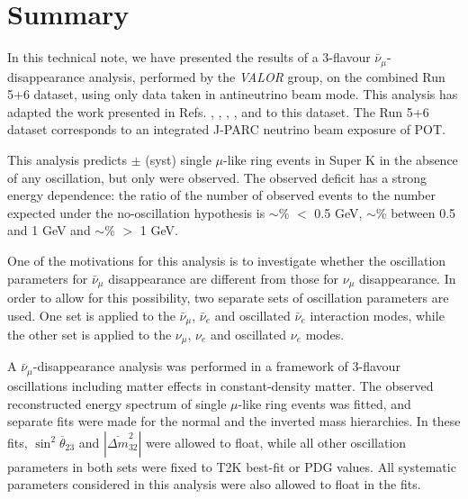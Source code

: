 \clearpage


\section {Summary}
\label{sec:summary}

In this technical note,
we have presented the results of a 3-flavour $\bar{\nu}_{\mu}$-disappearance analysis,
performed by the {\em VALOR} group,
on the combined Run 5+6 \TotalPot{} dataset, using only data taken in antineutrino beam mode.
This analysis has adapted the work presented in
Refs. \cite{OurRun1DisappAnalysis}, 
\cite{OurRun12DisappAnalysis}, 
\cite{OurRun12DisappAnalysis3Flavour},
\cite{OurRun123DisappAnalysis3Flavour},
\cite{OurRun1234aDisappAnalysis3Flavour} and 
\cite{OurRun1234DisappAnalysis3Flavour}
to this dataset. The Run 5+6 dataset corresponds to an integrated J-PARC neutrino beam
exposure of \TotalPot{} POT.

This analysis predicts \NskNoOscExpectation{} $\pm$ \NskNoOscExpectationError{} (syst)
single $\mu$-like ring events in Super K in the absence of any oscillation,
but only \NskObserved{} were observed. 
The observed deficit has a strong energy dependence: the ratio of the number of observed events to 
the number expected under the no-oscillation hypothesis is
$\sim$\NskRatioLowEnergy\% $<$ 0.5 GeV,
$\sim$\NskRatioMidEnergy\% between 0.5 and 1 GeV and
$\sim$\NskRatioHighEnergy\% $>$ 1 GeV.

One of the motivations for this analysis is to investigate whether the oscillation parameters for $\bar{\nu}_{\mu}$ 
disappearance are different from those for $\nu_{\mu}$ disappearance. In order to allow for this possibility, 
two separate sets of oscillation parameters are used. One set is applied to the $\bar{\nu}_{\mu}$, $\bar{\nu}_{e}$ 
and oscillated $\bar{\nu}_{e}$ interaction modes, while the other set is applied to the $\nu_{\mu}$, $\nu_{e}$ and 
oscillated $\nu_{e}$ modes.

A $\bar{\nu}_{\mu}$-disappearance analysis was performed
in a framework of 3-flavour oscillations including matter effects in constant-density matter.
The observed reconstructed energy spectrum of single $\mu$-like ring events was fitted,
and separate fits were made for the normal and the inverted mass hierarchies. In these fits, $\sin^{2}\overline{\theta}_{23}$ and 
$|\overline{\Delta m}^{2}_{32}|$
were allowed to float, while all other oscillation
parameters in both sets were fixed to T2K best-fit or PDG values. All \NSyst{} systematic
parameters considered in this analysis were also allowed to float in the fits.

